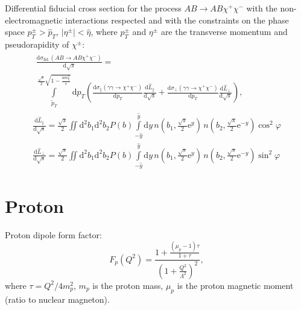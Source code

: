 \documentclass[a4paper,12pt]{article}
\newcommand{\abs}[1]{\lvert #1 \rvert}
\begin{document}
Differential fiducial cross section for the process $AB \to AB \chi^+ \chi^-$
with the non-electromagnetic interactions respected and with the constraints on
the phase space $p_T^\pm > \hat p_T$, $\abs{\eta^\pm} < \hat \eta$, where
$p_T^\pm$ and $\eta^\pm$ are the transverse momentum and pseudorapidity of
$\chi^\pm$:
\begin{gather}
  \begin{multlined}
    \frac{\mathrm{d} \sigma_\text{fid.}(AB \to AB \chi^+ \chi^-)}
         {\mathrm{d} \sqrt{s}}
    = \\ \int\limits_{\tilde p_T}
                    ^{\frac{\sqrt{s}}{2} \sqrt{1 - \frac{4 m_\chi^2}{s}}}
        \mathrm{d} p_T
        \left(
            \frac{\mathrm{d} \sigma_\parallel(\gamma \gamma \to \chi^+ \chi^-)}
                 {\mathrm{d} p_T}
            \frac{\mathrm{d} \hat L_\parallel}{\mathrm{d} \sqrt{s}}
          + \frac{\mathrm{d} \sigma_\perp(\gamma \gamma \to \chi^+ \chi^-)}
                 {\mathrm{d} p_T}
            \frac{\mathrm{d} \hat L_\perp}{\mathrm{d} \sqrt{s}}
        \right),
  \end{multlined}
  \\
  \frac{\mathrm{d} \hat L_\parallel}{\mathrm{d} \sqrt{s}}
  = \frac{\sqrt{s}}{2}
    \iint \mathrm{d}^2 b_1 \mathrm{d}^2 b_2 P(b)
    \int\limits_{-\hat y}^{\hat y} \mathrm{d} y
    \, n \left( b_1, \frac{\sqrt{s}}{2} \mathrm{e}^y    \right)
    \, n \left( b_2, \frac{\sqrt{s}}{2} \mathrm{e}^{-y} \right)
    \cos^2 \varphi
  \\
  \frac{\mathrm{d} \hat L_\perp}{\mathrm{d} \sqrt{s}}
  = \frac{\sqrt{s}}{2}
    \iint \mathrm{d}^2 b_1 \mathrm{d}^2 b_2 P(b)
    \int\limits_{-\hat y}^{\hat y} \mathrm{d} y
    \, n \left( b_1, \frac{\sqrt{s}}{2} \mathrm{e}^y    \right)
    \, n \left( b_2, \frac{\sqrt{s}}{2} \mathrm{e}^{-y} \right)
    \sin^2 \varphi
\end{gather}

\section{Proton}

Proton dipole form factor:
\begin{equation}
  F_p(Q^2)
  = \frac{1 + \frac{(\mu_p - 1) \tau}{1 + \tau}}
         {\left( 1 + \frac{Q^2}{\Lambda^2} \right)^2},
\end{equation}
where $\tau = Q^2 / 4 m_p^2$, $m_p$ is the proton mass, $\mu_p$ is the proton
magnetic moment (ratio to nuclear magneton).
\end{document}
